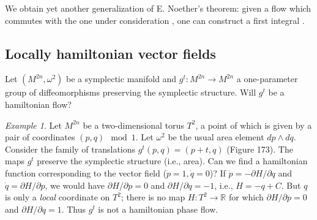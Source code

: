 \documentclass[leqno]{report}
\numberwithin{equation}{section}
\theoremstyle{plain}
\theoremstyle{definition}
\theoremstyle{remark}
\theoremstyle{smallcap}
\newtheorem*{ex*}{Example}
\numberwithin{prob}{section}
\begin{document}
We obtain yet another generalization of E. Noether's theorem:
given a flow 
which commutes with the one under consideration ,
one can construct a first integral .

\subsection{Locally hamiltonian vector fields}

Let $(M^{2n}, \omega^2)$ be a symplectic manifold and
$g^t: M^{2n} \to M^{2n}$
a one-parameter group of diffeomorphisms preserving
the symplectic structure.
%
Will $g^t$ be a hamiltonian flow?


\begin{ex*}
  Let $M^{2n}$ be a two-dimensional torus $T^2$,
  a point of which is given by a pair of coordinates
  $(p, q) \mod 1$.
  Let $\omega^2$ be the usual area element $dp \wedge dq$.
  Consider the family of translations
  $g^t(p, q) = (p + t, q)$ (Figure 173).
  The maps $g^t$ preserve the symplectic structure
  (i.e., area). Can we find a hamiltonian function
  corresponding to the vector field ($\dot p=1, \dot q = 0$)?
  If $\dot p = -\partial H/\partial q$
  and $\dot q = \partial H/\partial p$,
  we would have $\partial H/\partial p = 0$ and
  $\partial H/\partial q = -1$, i.e.,
  $H = -q + C$.
  But $q$ is only a \emph{local} coordinate on $T^2$;
  there is no map $H: T^2 \to \mathbb R$
  for which $\partial H/\partial p = 0$ and
  $\partial H/\partial q = 1$.
  Thus $g^t$ is not a hamiltonian phase flow.

  \setcounter{figure}{172}
  \begin{figure}[h]
    \centering
\end{figure}
\end{ex*}
\end{document}
